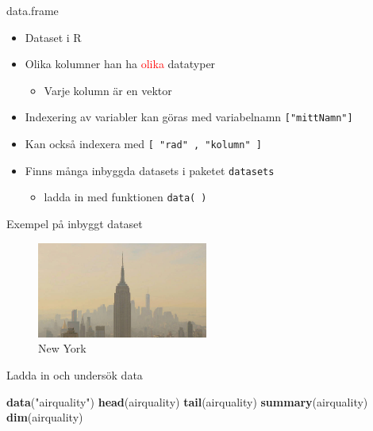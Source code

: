 \documentclass[
  11pt,
  ignorenonframetext,
]{beamer}
\newenvironment{Shaded}{\begin{snugshade}}{\end{snugshade}}
\newcommand{\FunctionTok}[1]{\textcolor[rgb]{0.13,0.29,0.53}{\textbf{#1}}}
\newcommand{\NormalTok}[1]{#1}
\newcommand{\StringTok}[1]{\textcolor[rgb]{0.31,0.60,0.02}{#1}}
\providecommand{\tightlist}{%
  \setlength{\itemsep}{0pt}\setlength{\parskip}{0pt}}
\begin{document}
\begin{frame}{data.frame}
\label{data.frame-1}
\begin{itemize}
\tightlist
\item
  Dataset i R
\item
  Olika kolumner han ha \textcolor{red}{olika} datatyper

  \begin{itemize}
  \tightlist
  \item
    Varje kolumn är en vektor
  \end{itemize}
\item
  Indexering av variabler kan göras med variabelnamn
  \texttt{["mittNamn"]}
\item
  Kan också indexera med \texttt{[ "rad" , "kolumn" ]}
\item
  Finns många inbyggda datasets i paketet \texttt{datasets}

  \begin{itemize}
  \tightlist
  \item
    ladda in med funktionen \texttt{data( )}
  \end{itemize}
\end{itemize}
\end{frame}

\begin{frame}[fragile]{Exempel på inbyggt dataset}
\label{exempel-puxe5-inbyggt-dataset}
\begin{figure}
\centering
\includegraphics[width=0.5\textwidth,height=\textheight]{images/ny.jpeg}
\caption{New York}
\end{figure}

Ladda in och undersök data

\begin{Shaded}
\begin{Highlighting}[]
\FunctionTok{data}\NormalTok{(}\StringTok{"airquality"}\NormalTok{)}
\FunctionTok{head}\NormalTok{(airquality)}
\FunctionTok{tail}\NormalTok{(airquality)}
\FunctionTok{summary}\NormalTok{(airquality)}
\FunctionTok{dim}\NormalTok{(airquality)}
\end{Highlighting}
\end{Shaded}
\end{frame}
\end{document}
